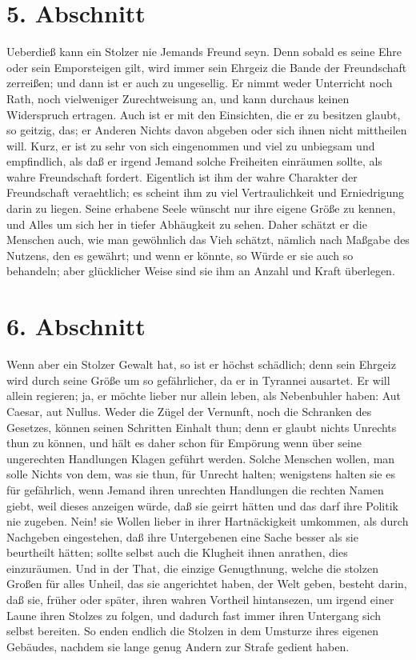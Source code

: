 \section{5. Abschnitt}

Ueberdieß kann ein Stolzer nie Jemands Freund seyn. Denn sobald es seine Ehre
oder sein Emporsteigen gilt, wird immer sein Ehrgeiz die Bande der Freundschaft
zerreißen; und dann ist er auch zu ungesellig. Er nimmt weder Unterricht noch
Rath, noch vielweniger Zurechtweisung an, und kann durchaus keinen Widerspruch
ertragen. Auch ist er mit den Einsichten, die er zu besitzen glaubt, so geitzig,
das; er Anderen Nichts davon abgeben oder sich ihnen nicht mittheilen will.
Kurz, er ist zu sehr von sich eingenommen und viel zu unbiegsam und empfindlich,
als daß er irgend Jemand solche Freiheiten einräumen sollte, als wahre
Freundschaft fordert. Eigentlich ist ihm der wahre Charakter der Freundschaft
veraehtlich; es scheint ihm zu viel Vertraulichkeit und Erniedrigung darin zu
liegen. Seine erhabene Seele wünscht nur ihre eigene Größe zu kennen, und Alles
um sich her in tiefer Abhäugkeit zu sehen. Daher schätzt er die Menschen auch,
wie man gewöhnlich das Vieh schätzt, nämlich nach Maßgabe des Nutzens, den es
gewährt; und wenn er könnte, so Würde er sie auch so behandeln; aber glücklicher
Weise sind sie ihm an Anzahl und Kraft überlegen.

\section{6. Abschnitt}

Wenn aber ein Stolzer Gewalt hat, so ist er höchst schädlich; denn sein Ehrgeiz
wird durch seine Größe um so gefährlicher, da er in Tyrannei ausartet. Er will
allein regieren; ja, er möchte lieber nur allein leben, als Nebenbuhler haben:
Aut Caesar, aut Nullus. Weder die Zügel der Vernunft, noch die Schranken des
Gesetzes, können seinen Schritten Einhalt thun; denn er glaubt nichts Unrechts
thun zu können, und hält es daher schon für Empörung wenn über seine ungerechten
Handlungen Klagen geführt werden. Solche Menschen wollen, man solle Nichts von
dem, was sie thun, für Unrecht halten; wenigstens halten sie es für gefährlich,
wenn Jemand ihren unrechten Handlungen die rechten Namen giebt, weil dieses
anzeigen würde, daß sie geirrt hätten und das darf ihre Politik nie zugeben.
Nein! sie Wollen lieber in ihrer Hartnäckigkeit umkommen, als durch Nachgeben
eingestehen, daß ihre Untergebenen eine Sache besser als sie beurtheilt hätten;
sollte selbst auch die Klugheit ihnen anrathen, dies einzuräumen. Und in der
That, die einzige Genugthnung, welche die stolzen Großen für alles Unheil, das
sie angerichtet haben, der Welt geben, besteht darin, daß sie, früher oder
später, ihren wahren Vortheil hintansezen, um irgend einer Laune ihren Stolzes
zu folgen, und dadurch fast immer ihren Untergang sich selbst bereiten. So enden
endlich die Stolzen in dem Umsturze ihres eigenen Gebäudes, nachdem sie lange
genug Andern zur Strafe gedient haben.

